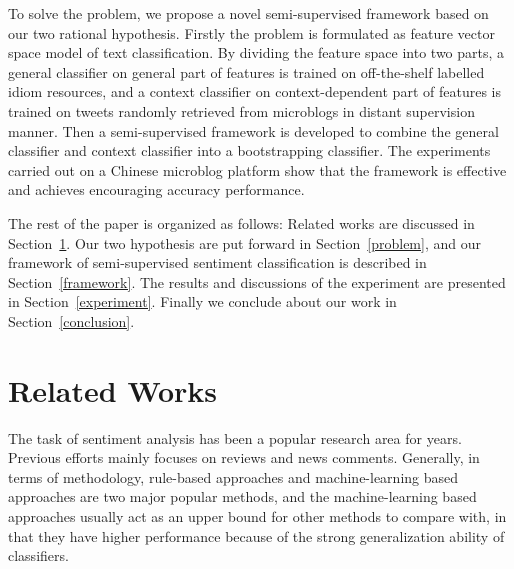 \documentclass{llncs}
\begin{document}
To solve the problem, we propose a novel semi-supervised framework based on our two rational hypothesis.
Firstly the problem is formulated as feature vector space model of text classification. 
By dividing the feature space into two parts, a general classifier on general part of features is trained on off-the-shelf labelled idiom resources, and a context classifier on context-dependent part of features is trained on tweets randomly retrieved from microblogs in distant supervision manner. 
Then a semi-supervised framework is developed to combine the general classifier and context classifier into a bootstrapping classifier. 
The experiments carried out on a Chinese microblog platform show that the framework is  effective and achieves encouraging accuracy performance.

The rest of the paper is organized as follows: Related works are discussed in Section~\ref{related}. Our two hypothesis are put forward in
Section~\ref{problem}, and our framework of semi-supervised sentiment classification is described in Section~\ref{framework}. The results and discussions of the experiment are presented in Section~\ref{experiment}. Finally we conclude about our work in Section~\ref{conclusion}.
\section{Related Works}
\label{related}
The task of sentiment analysis has been a popular research area for years. 
Previous efforts mainly focuses on reviews and news comments. 
Generally, in terms of methodology, rule-based approaches and machine-learning based approaches are two major popular methods, and the machine-learning based approaches usually act as an upper bound for other methods to compare with, in that they have higher performance because of the strong generalization ability of classifiers\cite{xsongx:b1,xsongx:b4}.
\end{document}
